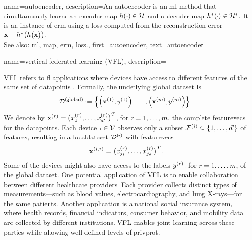 {name={autoencoder},
	description={An autoencoder is an \gls{ml} method that simultaneously learns an encoder \gls{map} 
		$h(\cdot) \in \mathcal{H}$ and a decoder \gls{map} $h^{*}(\cdot) \in \mathcal{H}^{*}$. 
		It is an instance of \gls{erm} using a \gls{loss} computed from the reconstruction error 
		${\bf x} - h^{*}\big(  h \big( {\bf x} \big) \big)$.
					\\ 
		See also: \gls{ml}, \gls{map}, \gls{erm}, \gls{loss}.},
	first={autoencoder},
	text={autoencoder}
} 

{name={vertical federated learning (VFL)},
	description={VFL refers to \gls{fl} applications where  
		\glspl{device} have access to different \glspl{feature} of the same set of \glspl{datapoint} \cite{VFLChapter}. 
		Formally, the underlying global \gls{dataset} is
		\[
		\mathcal{D}^{(\mathrm{global})} := \left\{ \left({\bf x}^{(1)}, y^{(1)}\right), \ldots, \left({\bf x}^{(m)}, y^{(m)}\right) \right\}.
		\]
		We denote by ${\bf x}^{(r)} = \big( x^{(r)}_{1}, \ldots, x^{(r)}_{d'} \big)^{T}$, for $r=1, \ldots, m$, 
	     	the complete \glspl{featurevec} for the \glspl{datapoint}. Each \gls{device} $i \in \mathcal{V}$ 
		observes only a subset $\mathcal{F}^{(i)} \subseteq \{1, \ldots, d'\}$ of \glspl{feature}, resulting 
		in a \gls{localdataset} $\mathcal{D}^{(i)}$ with \glspl{featurevec}
		\[
		{\bf x}^{(i,r)} = \big( x^{(r)}_{j_{1}}, \ldots, x^{(r)}_{j_{d}} \big)^{T}.
		\]
		Some of the \glspl{device} might also have access to the \glspl{label} $y^{(r)}$, for $r=1, \ldots, m$, 
		of the global \gls{dataset}. One potential application of VFL is to enable collaboration between 
		different healthcare providers. Each provider collects distinct types of measurements—such as blood 
		values, electrocardiography, and lung X-rays—for the same patients. Another application is a 
		national social insurance system, where health records, financial indicators, consumer behavior, 
		and mobility \gls{data} are collected by different institutions. VFL enables joint learning across 
		these parties while allowing well-defined levels of \gls{privprot}.
		\begin{figure}[H]

\end{figure}}}
